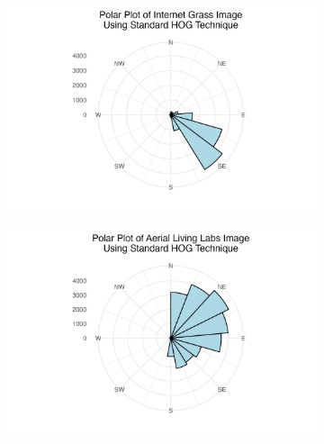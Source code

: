 \documentclass[
  letterpaper,
  DIV=11,
  numbers=noendperiod]{scrreprt}
\begin{document}
\begin{figure}

\begin{minipage}{0.33\linewidth}

\begin{figure}[H]

{\centering \includegraphics{images/plots/grass/internet_grass_standard_polar_plot.jpg}

}


\end{figure}%

\end{minipage}%
%
\begin{minipage}{0.33\linewidth}

\begin{figure}[H]

{\centering \includegraphics{images/plots/grass/aerial_living_lab_standard_polar_plot.jpg}

}
\end{figure}
\end{minipage}
\end{figure}
\end{document}
